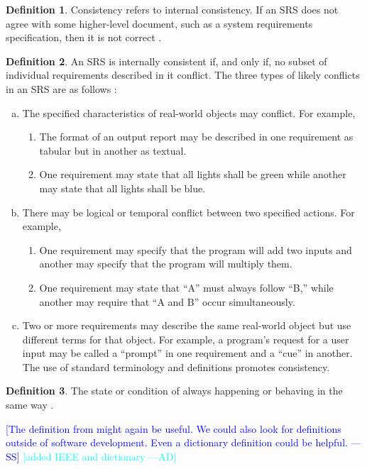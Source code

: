 \documentclass[letterpaper,cleveref]{lipics-v2019}
\newcommand{\authornote}[3]{\textcolor{#1}{[#3 ---#2]}}
\newcommand{\authornote}[3]{}
\newcommand{\wss}[1]{\authornote{blue}{SS}{#1}} %
\newcommand{\ad}[1]{\authornote{cyan}{AD}{#1}} %
\theoremstyle{definition}
\newtheorem{defn}{Definition}
\begin{document}
\begin{defn}
Consistency refers to internal consistency. If an SRS does not agree with some
higher-level document, such as a system requirements specification, then it is
not correct \citep{IEEE1998}.
\end{defn}
\begin{defn}
An SRS is internally consistent if, and only if, no subset of individual
requirements described in it conflict. The three types of likely conflicts in an
SRS are as follows \citep{IEEE1998}:
	\begin{enumerate}[a)]
\item The specified characteristics of real-world objects may conflict. For
example,
	\begin{enumerate}[1)]
\item The format of an output report may be described in one requirement as
tabular but in another as textual.
\item One requirement may state that all lights shall be green while another may
state that all lights shall be blue.
	\end{enumerate}
\item There may be logical or temporal conflict between two specified actions.
For example,
	\begin{enumerate}[1)]
\item One requirement may specify that the program will add two inputs and
another may specify that the program will multiply them.
\item One requirement may state that “A” must always follow “B,” while another
may require that “A and B” occur simultaneously.
	\end{enumerate}
\item Two or more requirements may describe the same real-world object but use
different terms for that object. For example, a program’s request for a user
input may be called a “prompt” in one requirement and a “cue” in another. The
use of standard terminology and definitions promotes consistency.
	\end{enumerate}
\end{defn}
\begin{defn}
The state or condition of always happening or behaving in the same way
\citep{CambridgeConsistency2019}.
\end{defn}

\wss{The definition from \citet{IEEE1998} might again be useful.  We could also
  look for definitions outside of software development.  Even a dictionary
  definition could be helpful.}
\ad{added IEEE and dictionary}
\end{document}
